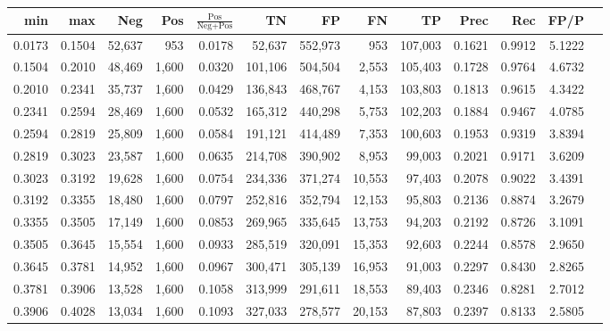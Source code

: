 \begin{tabular}{rrrrrrrrrrrrr}
\toprule
   min &    max &    Neg &   Pos & $\frac{\text{Pos}}{\text{Neg}+\text{Pos}}$ &      TN &      FP &      FN &      TP &   Prec &    Rec &   FP/P \\
\midrule
0.0173 & 0.1504 & 52,637 &   953 &                                     0.0178 &  52,637 & 552,973 &     953 & 107,003 & 0.1621 & 0.9912 & 5.1222 \\
0.1504 & 0.2010 & 48,469 & 1,600 &                                     0.0320 & 101,106 & 504,504 &   2,553 & 105,403 & 0.1728 & 0.9764 & 4.6732 \\
0.2010 & 0.2341 & 35,737 & 1,600 &                                     0.0429 & 136,843 & 468,767 &   4,153 & 103,803 & 0.1813 & 0.9615 & 4.3422 \\
0.2341 & 0.2594 & 28,469 & 1,600 &                                     0.0532 & 165,312 & 440,298 &   5,753 & 102,203 & 0.1884 & 0.9467 & 4.0785 \\
0.2594 & 0.2819 & 25,809 & 1,600 &                                     0.0584 & 191,121 & 414,489 &   7,353 & 100,603 & 0.1953 & 0.9319 & 3.8394 \\
0.2819 & 0.3023 & 23,587 & 1,600 &                                     0.0635 & 214,708 & 390,902 &   8,953 &  99,003 & 0.2021 & 0.9171 & 3.6209 \\
0.3023 & 0.3192 & 19,628 & 1,600 &                                     0.0754 & 234,336 & 371,274 &  10,553 &  97,403 & 0.2078 & 0.9022 & 3.4391 \\
0.3192 & 0.3355 & 18,480 & 1,600 &                                     0.0797 & 252,816 & 352,794 &  12,153 &  95,803 & 0.2136 & 0.8874 & 3.2679 \\
0.3355 & 0.3505 & 17,149 & 1,600 &                                     0.0853 & 269,965 & 335,645 &  13,753 &  94,203 & 0.2192 & 0.8726 & 3.1091 \\
0.3505 & 0.3645 & 15,554 & 1,600 &                                     0.0933 & 285,519 & 320,091 &  15,353 &  92,603 & 0.2244 & 0.8578 & 2.9650 \\
0.3645 & 0.3781 & 14,952 & 1,600 &                                     0.0967 & 300,471 & 305,139 &  16,953 &  91,003 & 0.2297 & 0.8430 & 2.8265 \\
0.3781 & 0.3906 & 13,528 & 1,600 &                                     0.1058 & 313,999 & 291,611 &  18,553 &  89,403 & 0.2346 & 0.8281 & 2.7012 \\
0.3906 & 0.4028 & 13,034 & 1,600 &                                     0.1093 & 327,033 & 278,577 &  20,153 &  87,803 & 0.2397 & 0.8133 & 2.5805 \\

\end{tabular}
